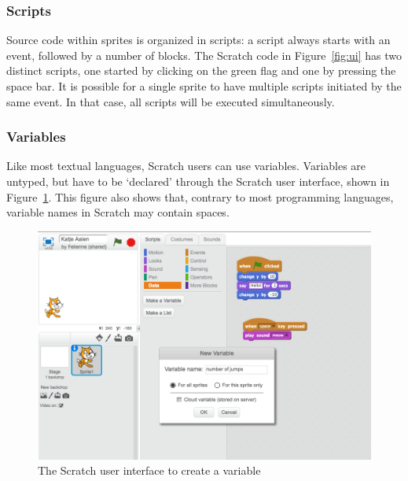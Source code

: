 \documentclass[conference]{IEEEtran}
\begin{document}

\subsubsection{Scripts}
Source code within sprites is organized in scripts: a script always starts with an event, followed by a number of blocks. The Scratch code in Figure~\ref{fig:ui} has two distinct scripts, one started by clicking on the green flag and one by pressing the space bar. It is possible for a single sprite to have multiple scripts initiated by the same event. In that case, all scripts will be executed simultaneously. 



\subsubsection{Variables}
Like most textual languages, Scratch users can use variables. Variables are untyped, but have to be `declared' through the Scratch user interface, shown in Figure~\ref{fig:ui-vars}. This figure also shows that, contrary to most programming languages, variable names in Scratch may contain spaces.

\begin{figure}
  \begin{center}
  \includegraphics[width=\columnwidth]{fig/ui-vars.png}
  \caption{The Scratch user interface to create a variable}
  \label{fig:ui-vars}
  \end{center}
\end{figure} 
\end{document}

